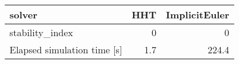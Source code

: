 \begin{tabular}{lrr}
\hline
 solver                      &   HHT &   ImplicitEuler \\
\hline
 stability\_index             &   0   &             0   \\
 Elapsed simulation time [s] &   1.7 &           224.4 \\
\hline
\end{tabular}